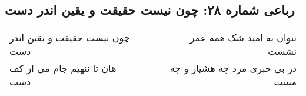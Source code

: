 \begin{center}
\section*{رباعی شماره ۲۸: چون نیست حقیقت و یقین اندر دست}
\label{sec:sh028}
\begin{longtable}{l p{0.5cm} r}
چون نیست حقیقت و یقین اندر دست
&&
نتوان به امید شک همه عمر نشست
\\
هان تا ننهیم جام می از کف دست
&&
در بی خبری مرد چه هشیار و چه مست
\\
\end{longtable}
\end{center}
